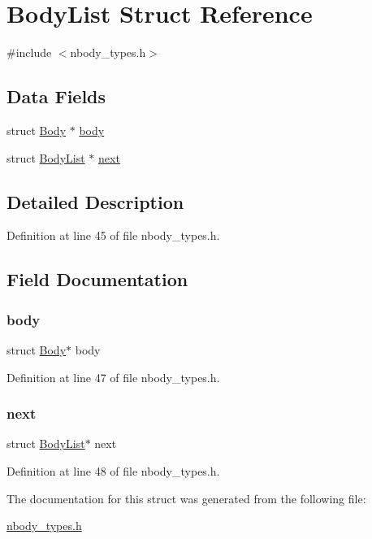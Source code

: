 \hypertarget{struct_body_list}{}\section{Body\+List Struct Reference}
\label{struct_body_list}


{\ttfamily \#include $<$nbody\+\_\+types.\+h$>$}

\subsection*{Data Fields}
\begin{DoxyCompactItemize}
\item 
struct \hyperlink{struct_body}{Body} $\ast$ \hyperlink{struct_body_list_a5d4b20fb6acb8bdb769db95280c18dcb}{body}
\item 
struct \hyperlink{struct_body_list}{Body\+List} $\ast$ \hyperlink{struct_body_list_ab63aea1170041eff3f6b711fcf1b8784}{next}
\end{DoxyCompactItemize}


\subsection{Detailed Description}


Definition at line 45 of file nbody\+\_\+types.\+h.



\subsection{Field Documentation}
\hypertarget{struct_body_list_a5d4b20fb6acb8bdb769db95280c18dcb}{}\label{struct_body_list_a5d4b20fb6acb8bdb769db95280c18dcb} 
\subsubsection{\texorpdfstring{body}{body}}
{\footnotesize\ttfamily struct \hyperlink{struct_body}{Body}$\ast$ body}



Definition at line 47 of file nbody\+\_\+types.\+h.

\hypertarget{struct_body_list_ab63aea1170041eff3f6b711fcf1b8784}{}\label{struct_body_list_ab63aea1170041eff3f6b711fcf1b8784} 
\subsubsection{\texorpdfstring{next}{next}}
{\footnotesize\ttfamily struct \hyperlink{struct_body_list}{Body\+List}$\ast$ next}



Definition at line 48 of file nbody\+\_\+types.\+h.



The documentation for this struct was generated from the following file\+:\begin{DoxyCompactItemize}
\item 
\hyperlink{nbody__types_8h}{nbody\+\_\+types.\+h}\end{DoxyCompactItemize}
